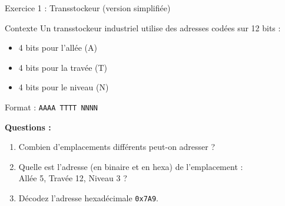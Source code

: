 \documentclass[aspectratio=1610]{beamer}
\begin{document}
\begin{frame}{Exercice 1 : Transstockeur (version simplifiée)}

  \begin{exampleblock}{Contexte}
    Un transstockeur industriel utilise des adresses codées sur 12 bits :
    \begin{itemize}
      \item 4 bits pour l'allée (A)
      \item 4 bits pour la travée (T)
      \item 4 bits pour le niveau (N)
    \end{itemize}
    Format : \texttt{AAAA TTTT NNNN}
  \end{exampleblock}

  \vspace{0.3cm}

  \textbf{Questions :}

  \begin{enumerate}
    \item Combien d'emplacements différents peut-on adresser ?
    \item Quelle est l'adresse (en binaire et en hexa) de l'emplacement : \\
          Allée 5, Travée 12, Niveau 3 ?
    \item Décodez l'adresse hexadécimale \texttt{0x7A9}.
  \end{enumerate}


\end{frame}
\end{document}
